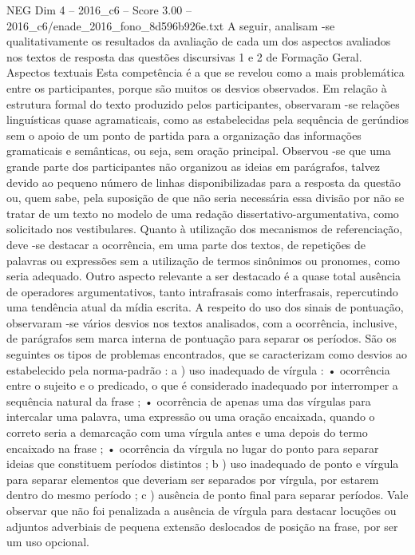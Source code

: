 \begin{textsample}{NEG Dim 4 – 2016\_c6 – Score 3.00 – 2016\_c6/enade\_2016\_fono\_8d596b926e.txt}
A seguir, analisam -se qualitativamente os resultados da avaliação de cada um dos aspectos avaliados nos textos de resposta das questões discursivas 1 e 2 de Formação Geral.
Aspectos textuais Esta competência é a que se revelou como a mais problemática entre os participantes, porque são muitos os desvios observados.
Em relação à estrutura formal do texto produzido pelos participantes, observaram -se relações linguísticas quase agramaticais, como as estabelecidas pela sequência de gerúndios sem o apoio de um ponto de partida para a organização das informações gramaticais e semânticas, ou seja, sem oração principal.
Observou -se que uma grande parte dos participantes não organizou as ideias em parágrafos, talvez devido ao pequeno número de linhas disponibilizadas para a resposta da questão ou, quem sabe, pela suposição de que não seria necessária essa divisão por não se tratar de um texto no modelo de uma redação dissertativo-argumentativa, como solicitado nos vestibulares.
Quanto à utilização dos mecanismos de referenciação, deve -se destacar a ocorrência, em uma parte dos textos, de repetições de palavras ou expressões sem a utilização de termos sinônimos ou pronomes, como seria adequado.
Outro aspecto relevante a ser destacado é a quase total ausência de operadores argumentativos, tanto intrafrasais como interfrasais, repercutindo uma tendência atual da mídia escrita.
A respeito do uso dos sinais de pontuação, observaram -se vários desvios nos textos analisados, com a ocorrência, inclusive, de parágrafos sem marca interna de pontuação para separar os períodos.
São os seguintes os tipos de problemas encontrados, que se caracterizam como desvios ao estabelecido pela norma-padrão : a ) uso inadequado de vírgula : • ocorrência entre o sujeito e o predicado, o que é considerado inadequado por interromper a sequência natural da frase ; • ocorrência de apenas uma das vírgulas para intercalar uma palavra, uma expressão ou uma oração encaixada, quando o correto seria a demarcação com uma vírgula antes e uma depois do termo encaixado na frase ; • ocorrência da vírgula no lugar do ponto para separar ideias que constituem períodos distintos ; b ) uso inadequado de ponto e vírgula para separar elementos que deveriam ser separados por vírgula, por estarem dentro do mesmo período ; c ) ausência de ponto final para separar períodos.
Vale observar que não foi penalizada a ausência de vírgula para destacar locuções ou adjuntos adverbiais de pequena extensão deslocados de posição na frase, por ser um uso opcional.

\end{textsample}
